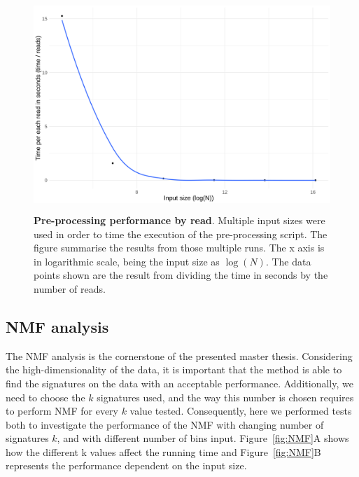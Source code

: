 \begin{figure}[h]
    \centering
    \includegraphics[height=8cm]{Figures/performance/performance_per_read.png}
    \caption[Pre-processing performance by read]{\textbf{Pre-processing performance by read}. Multiple input sizes were used in order to time the execution of the pre-processing script. The figure summarise the results from those multiple runs. The x axis is in logarithmic scale, being the input size as \(\log(N)\). The data points shown are the result from dividing the time in seconds by the number of reads.}
    \label{fig:PreProcess}
\end{figure}

\medskip

\subsection{NMF analysis}

The NMF analysis is the cornerstone of the presented master thesis. Considering the high-dimensionality of the data, it is important that the method is able to find the signatures on the data with an acceptable performance. Additionally, we need to choose the \(k\) signatures used, and the way this number is chosen requires to perform NMF for every \(k\) value tested. Consequently, here we performed tests both to investigate the performance of the NMF with changing number of signatures \(k\), and with different number of bins input. Figure~\ref{fig:NMF}A shows how the different k values affect the running time and Figure~\ref{fig:NMF}B represents the performance dependent on the input size.

